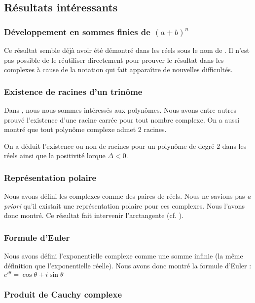 \subsection{Résultats intéressants}

\subsubsection{D\'eveloppement en sommes finies de $(a + b) ^ n$}

Ce résultat semble déjà avoir été démontré dans les réels sous le nom de . Il n'est pas possible de le réutiliser directement pour prouver le résultat dans les complexes à cause de la notation  qui fait apparaître de nouvelles difficultés.

\subsubsection{Existence de racines d'un trinôme}

Dans , nous nous sommes intéressés aux polynômes. Nous avons entre autres prouvé l'existence d'une racine carrée pour tout nombre complexe. On a aussi montré que tout polynôme complexe admet 2 racines.

On a déduit l'existence ou non de racines pour un polynôme de degré 2 dans les réels ainsi que la positivité lorque $\Delta < 0$.

\subsubsection{Représentation polaire}

Nous avons défini les complexes comme des paires de réels. Nous ne savions pas \emph{a priori} qu'il existait une représentation polaire pour ces complexes. Nous l'avons donc montré. Ce résultat fait intervenir l'arctangente (cf. ).

\subsubsection{Formule d'Euler}

Nous avons défini l'exponentielle complexe comme une somme infinie (la même définition que l'exponentielle réelle). Nous avons donc montré la formule d'Euler : $ e^{ i\theta } = \cos \theta + i\sin \theta $

\subsubsection{Produit de Cauchy complexe}%

